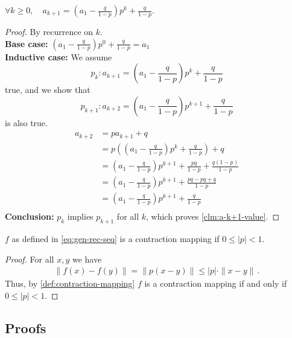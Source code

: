 \begin{proposition}\label{clm:a-k+1-value}
$\forall k \geq 0,  \quad a_{k+1} = (a_1 - \frac{q}{1-p})p^k + \frac{q}{1-p}$.
\end{proposition}
\begin{proof} By recurrence on $k$. \\
    \textbf{Base case:} $(a_1 - \frac{q}{1-p})p^0 + \frac{q}{1-p} = a_1$ \\
    \textbf{Inductive case:} We assume $$p_k : a_{k+1} = (a_1 - \frac{q}{1-p})p^k +
    \frac{q}{1-p}$$ true, and we show that $$p_{k+1} : a_{k+2} = (a_1 -
    \frac{q}{1-p})p^{k+1} + \frac{q}{1-p}$$ is also true.
    \begin{equation*}
        \begin{aligned}
            a_{k+2}
            & = p a_{k+1} + q \\
            & = p \left((a_1 - \frac{q}{1-p})p^k + \frac{q}{1-p}\right) + q \\
            & = (a_1 - \frac{q}{1-p})p^{k+1} + \frac{pq}{1-p} + \frac{q(1-p)}{1-p} \\
            & = (a_1 - \frac{q}{1-p})p^{k+1} + \frac{pq - pq + q}{1-p} \\
            & = (a_1 - \frac{q}{1-p})p^{k+1} + \frac{q}{1-p} \\
        \end{aligned}
    \end{equation*}
\textbf{Conclusion:} $p_k$ implies $p_{k+1}$ for all $k$, which proves
\autoref{clm:a-k+1-value}.
\end{proof}

\begin{proposition}\label{prop:f-convergence-mapping}
    $f$ as defined in \autoref{eq:gen-rec-seq} is a contraction mapping if $0
    \leq |p| < 1$.
\end{proposition}
\begin{proof}
    For all $x,y$ we have
    \begin{equation*}
        \begin{aligned}
            \| f(x) - f(y) \| = \| p(x-y) \| \leq |p| \cdot \| x-y \| \, .
        \end{aligned}
    \end{equation*}
    Thus, by \autoref{def:contraction-mapping} $f$ is a contraction mapping if
    and only if $0 \leq |p| < 1$.
\end{proof}

\subsection{Proofs}
\printProofs